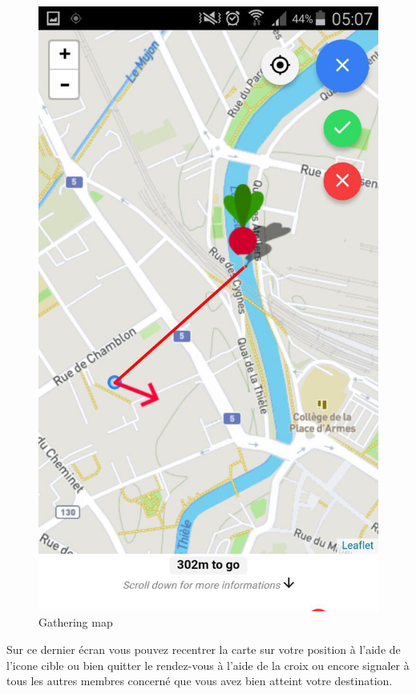 \documentclass[french]{article}
\begin{document}
	\begin{figure}[H]
		\centering
		\includegraphics{../screenshot/screenshot-map}
		\caption{Gathering map}
		\label{Gathering map}
	\end{figure} 
	Sur ce dernier écran vous pouvez recentrer la carte sur votre position à l'aide de l'icone cible ou bien quitter le rendez-vous à l'aide de la croix ou encore signaler à tous les autres membres concerné que vous avez bien atteint votre destination.
		
	
\end{document}
